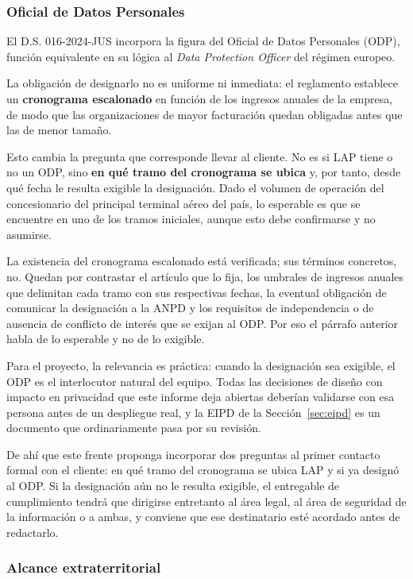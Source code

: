 \subsubsection{Oficial de Datos Personales}
\label{sec:odp}

El D.S. 016-2024-JUS incorpora la figura del Oficial de Datos Personales
(ODP), función equivalente en su lógica al \emph{Data Protection Officer}
del régimen europeo.

La obligación de designarlo no es uniforme ni inmediata: el reglamento
establece un \textbf{cronograma escalonado} en función de los ingresos
anuales de la empresa, de modo que las organizaciones de mayor facturación
quedan obligadas antes que las de menor tamaño.

Esto cambia la pregunta que corresponde llevar al cliente. No es si LAP
tiene o no un ODP, sino \textbf{en qué tramo del cronograma se ubica} y,
por tanto, desde qué fecha le resulta exigible la designación. Dado el
volumen de operación del concesionario del principal terminal aéreo del
país, lo esperable es que se encuentre en uno de los tramos iniciales,
aunque esto debe confirmarse y no asumirse.

La existencia del cronograma escalonado está verificada; sus términos
concretos, no. Quedan por contrastar el artículo que lo fija, los
umbrales de ingresos anuales que delimitan cada tramo con sus respectivas
fechas, la eventual obligación de comunicar la designación a la ANPD y
los requisitos de independencia o de ausencia de conflicto de interés que
se exijan al ODP. Por eso el párrafo anterior habla de lo esperable y no
de lo exigible.

Para el proyecto, la relevancia es práctica: cuando la designación sea
exigible, el ODP es el interlocutor natural del equipo. Todas las
decisiones de diseño con impacto en privacidad que este informe deja
abiertas deberían validarse con esa persona antes de un despliegue real,
y la EIPD de la Sección~\ref{sec:eipd} es un documento que ordinariamente
pasa por su revisión.

De ahí que este frente proponga incorporar dos preguntas al primer
contacto formal con el cliente: en qué tramo del cronograma se ubica LAP
y si ya designó al ODP. Si la designación aún no le resulta exigible, el
entregable de cumplimiento tendrá que dirigirse entretanto al área legal,
al área de seguridad de la información o a ambas, y conviene que ese
destinatario esté acordado antes de redactarlo.

\subsubsection{Alcance extraterritorial}
\label{sec:extraterritorial}

